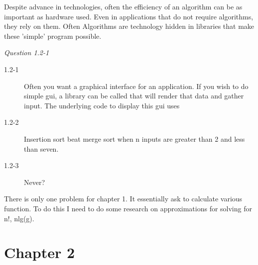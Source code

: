 \documentclass{article}
\begin{document}
Despite advance in technologies, often the efficiency of an algorithm can be as
important as hardware used. Even in applications that do not require
algorithms, they rely on them. Often Algorithms are technology hidden in
libraries that make these 'simple' program possible. 

\textit{Question 1.2-1}
\begin{description}
\item[1.2-1]
Often you want a graphical interface for an application. If you wish to do
simple gui, a library can be called that will render that data and gather
input. The underlying code to display this gui uses   
\item[1.2-2]
Insertion sort beat merge sort when n inputs are greater than 2 and less than
seven. 
\item[1.2-3] 
Never?
\end{description}
There is only one problem for chapter 1. It essentially ask to calculate
various function. To do this I need to do some research on approximations for
solving for n!, nlg(g).   
\section*{Chapter 2}
\end{document}
